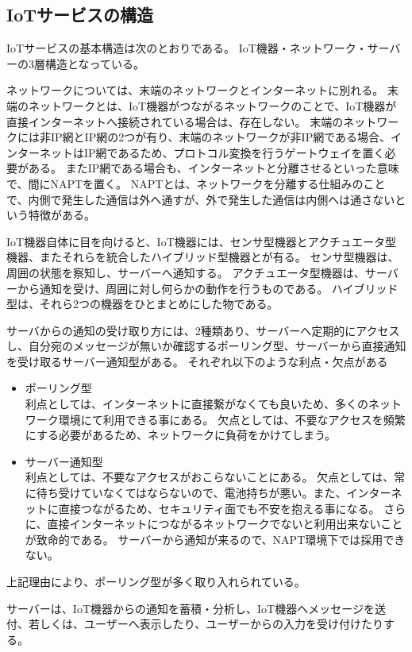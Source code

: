 \subsection{IoTサービスの構造}
IoTサービスの基本構造は次のとおりである。
IoT機器・ネットワーク・サーバーの3層構造となっている。

ネットワークについては、末端のネットワークとインターネットに別れる。
末端のネットワークとは、IoT機器がつながるネットワークのことで、IoT機器が直接インターネットへ接続されている場合は、存在しない。
末端のネットワークには非IP網とIP網の2つが有り、末端のネットワークが非IP網である場合、インターネットはIP網であるため、プロトコル変換を行うゲートウェイを置く必要がある。
またIP網である場合も、インターネットと分離させるといった意味で、間にNAPTを置く。
NAPTとは、ネットワークを分離する仕組みのことで、内側で発生した通信は外へ通すが、外で発生した通信は内側へは通さないという特徴がある。

IoT機器自体に目を向けると、IoT機器には、センサ型機器とアクチュエータ型機器、またそれらを統合したハイブリッド型機器とが有る。
センサ型機器は、周囲の状態を察知し、サーバーへ通知する。
アクチュエータ型機器は、サーバーから通知を受け、周囲に対し何らかの動作を行うものである。
ハイブリッド型は、それら2つの機器をひとまとめにした物である。

サーバからの通知の受け取り方には、2種類あり、サーバーへ定期的にアクセスし、自分宛のメッセージが無いか確認するポーリング型、サーバーから直接通知を受け取るサーバー通知型がある。
それぞれ以下のような利点・欠点がある
\begin{itemize}
	\item ポーリング型\\
		利点としては、インターネットに直接繋がなくても良いため、多くのネットワーク環境にて利用できる事にある。
		欠点としては、不要なアクセスを頻繁にする必要があるため、ネットワークに負荷をかけてしまう。
	\item サーバー通知型\\
		利点としては、不要なアクセスがおこらないことにある。
		欠点としては、常に待ち受けていなくてはならないので、電池持ちが悪い。また、インターネットに直接つながるため、セキュリティ面でも不安を抱える事になる。
		さらに、直接インターネットにつながるネットワークでないと利用出来ないことが致命的である。
		サーバーから通知が来るので、NAPT環境下では採用できない。
\end{itemize}
上記理由により、ポーリング型が多く取り入れられている。

サーバーは、IoT機器からの通知を蓄積・分析し、IoT機器へメッセージを送付、若しくは、ユーザーへ表示したり、ユーザーからの入力を受け付けたりする。


